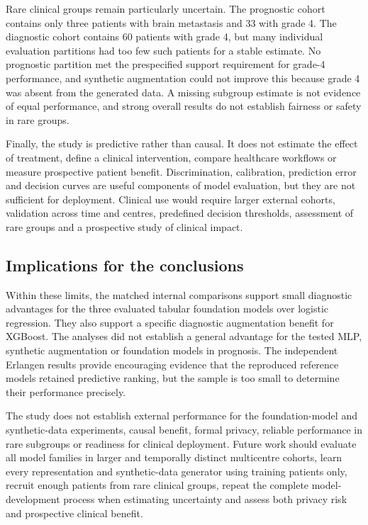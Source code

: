 Rare clinical groups remain particularly uncertain. The prognostic cohort
contains only three patients with brain metastasis and 33 with grade 4. The
diagnostic cohort contains 60 patients with grade 4, but many individual
evaluation partitions had too few such patients for a stable estimate. No
prognostic partition met the prespecified support requirement for grade-4
performance, and synthetic augmentation could not improve this because grade 4
was absent from the generated data. A missing subgroup estimate is not evidence
of equal performance, and strong overall results do not establish fairness or
safety in rare groups.

Finally, the study is predictive rather than causal. It does not estimate the
effect of treatment, define a clinical intervention, compare healthcare
workflows or measure prospective patient benefit. Discrimination, calibration,
prediction error and decision curves are useful components of model evaluation,
but they are not sufficient for deployment. Clinical use would require larger
external cohorts, validation across time and centres, predefined decision
thresholds, assessment of rare groups and a prospective study of clinical
impact.

\subsection{Implications for the conclusions}

Within these limits, the matched internal comparisons support small diagnostic
advantages for the three evaluated tabular foundation models over logistic
regression. They also support a specific diagnostic augmentation benefit for
XGBoost. The analyses did not establish a general advantage for the tested MLP,
synthetic augmentation or foundation models in prognosis. The independent
Erlangen results provide encouraging evidence that the reproduced reference
models retained predictive ranking, but the sample is too small to determine
their performance precisely.

The study does not establish external performance for the foundation-model and
synthetic-data experiments, causal benefit, formal privacy, reliable performance
in rare subgroups or readiness for clinical deployment. Future work should
evaluate all model families in larger and temporally distinct multicentre
cohorts, learn every representation and synthetic-data generator using training
patients only, recruit enough patients from rare clinical groups, repeat the
complete model-development process when estimating uncertainty and assess both
privacy risk and prospective clinical benefit.
